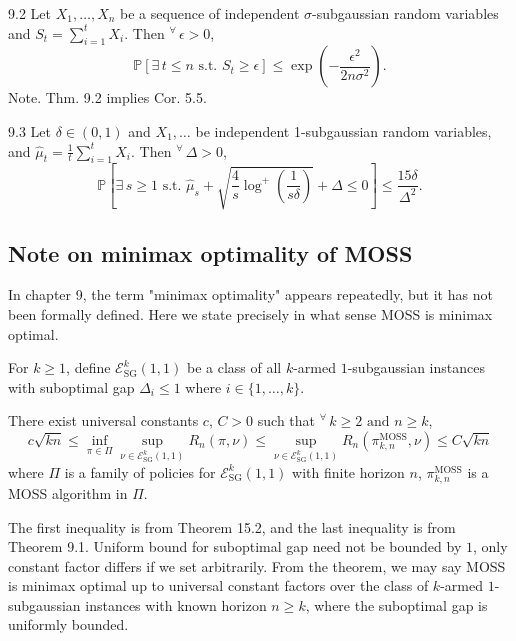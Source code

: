 \documentclass[10pt]{article}
\newenvironment{theorem*}[1]{%
  \IfBlankTF{#1}
    {\renewcommand{\themanualtheoreminner}{\unskip}}
    {\renewcommand\themanualtheoreminner{#1}}%
  \manualtheoreminner
}{\endmanualtheoreminner}
\newenvironment{lemma*}[1]{%
  \IfBlankTF{#1}
    {\renewcommand{\themanuallemmainner}{\unskip}}
    {\renewcommand\themanuallemmainner{#1}}%
  \manuallemmainner
}{\endmanuallemmainner}
\theoremstyle{definition}
\newenvironment{definition*}[1]{%
  \IfBlankTF{#1}
    {\renewcommand{\themanualdefinitioninner}{\unskip}}
    {\renewcommand\themanualdefinitioninner{#1}}%
  \manualdefinitioninner
}{\endmanualdefinitioninner}
\begin{document}
\begin{theorem*}{9.2}
    Let $X_1, \ldots, X_n$ be a sequence of independent $\sigma$-subgaussian random variables and
    $S_t = \sum_{i=1}^t X_i$. Then $^\forall \, \epsilon > 0$,
    \begin{equation*}
        \mathbb{P}[\exists \, t \leq n \text{ s.t. } S_t \geq \epsilon] \leq \exp \left(- \frac{\epsilon^2}{2n \sigma^2} \right).
    \end{equation*}
    Note. Thm. 9.2 implies Cor. 5.5.
\end{theorem*}

\begin{lemma*}{9.3}
    Let $\delta \in (0,1)$ and $X_1, \ldots$ be independent 1-subgaussian random variables, and $\hat{\mu}_t = \frac{1}{t}\sum_{i=1}^t X_i$.
    Then $^\forall \, \Delta > 0$,
    \begin{equation*}
        \mathbb{P}\left[ \exists \, s \geq 1 \text{ s.t. } \hat{\mu}_s + \sqrt{\frac{4}{s} \log^+ \left( \frac{1}{s\delta} \right)} + \Delta \leq 0 \right] \leq \frac{15\delta}{\Delta^2}.
    \end{equation*}
\end{lemma*}

\subsection{Note on minimax optimality of MOSS}
In chapter 9, the term "minimax optimality" appears repeatedly, but it has not been formally defined.
Here we state precisely in what sense MOSS is minimax optimal.
\begin{definition*}{}
    For $k \geq 1$, define $\mathcal{E}_{\text{SG}}^k(1,1)$ be a class of all $k$-armed $1$-subgaussian instances with suboptimal gap $\Delta_i \leq 1$ where $i \in \{1, \ldots, k \}$. 
\end{definition*}
\begin{theorem*}{}
    There exist universal constants $c, \, C>0$ such that $^\forall \, k \geq 2 \text{ and } n \geq k$,
    \begin{equation*}
        c\sqrt{kn} \leq \inf_{\pi \in \Pi} \sup_{\nu \in \mathcal{E}_{\text{SG}}^{k}(1,1)} R_n(\pi, \nu) \leq \sup_{\nu \in \mathcal{E}_{\text{SG}}^{k}(1,1)} R_n(\pi_{k,n}^{\text{MOSS}},\nu) \leq C \sqrt{kn}
    \end{equation*}
    where $\Pi$ is a family of policies for $\mathcal{E}_{\text{SG}}^k(1,1)$ with finite horizon $n$, $\pi_{k,n}^{\text{MOSS}}$ is a MOSS algorithm in $\Pi$.
\end{theorem*}
The first inequality is from Theorem 15.2, and the last inequality is from Theorem 9.1.
Uniform bound for suboptimal gap need not be bounded by $1$, only constant factor differs if we set arbitrarily.
From the theorem, we may say MOSS is minimax optimal up to universal constant factors over the class of $k$-armed $1$-subgaussian instances with known horizon $n \geq k$, where the suboptimal gap is uniformly bounded.
\end{document}

